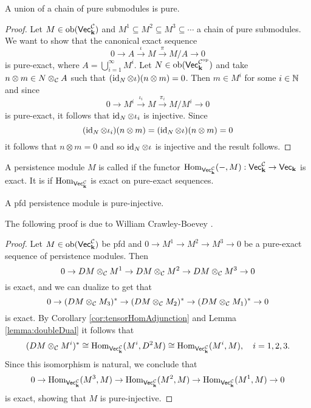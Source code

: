 \begin{lemma}\label{lemma:unionIsPure}
    A union of a chain of pure submodules is pure.
\end{lemma}
\begin{proof}
    Let $M\in\operatorname{ob}(\normalfont\mathsf{Vec}_{\mathbf{k}}^{\mathcal{C}})$ and $M^1\subseteq M^2\subseteq M^3\subseteq\cdots$ a chain of pure submodules.
    We want to show that the canonical exact sequence
    \begin{equation}\label{eq:limitOfChain}
        0\to A\xrightarrow{\iota} M\xrightarrow{\pi} M/A\to 0 
    \end{equation}
    is pure-exact, where $A=\bigcup_{i=1}^\infty M^i$.
    Let $N\in\operatorname{ob}(\normalfont\mathsf{Vec}_{\mathbf{k}}^{\mathcal{C}^{\text{op}}})$ and take $n\otimes m\in N\otimes_{\mathcal{C}} A$ such that $(\operatorname{id}_N\otimes\iota)(n\otimes m)=0$.
    Then $m\in M^i$ for some $i\in\mathbb{N}$ and since
    \[ 0\to M^i\xrightarrow{\iota_i} M\xrightarrow{\pi_i} M/M^i\to 0 \]
    is pure-exact, it follows that $\operatorname{id}_N\otimes\iota_i$ is injective. Since
    \[ (\operatorname{id}_N\otimes\iota_i)(n\otimes m)=(\operatorname{id}_N\otimes\iota)(n\otimes m)=0 \]
    it follows that $n\otimes m=0$ and so $\operatorname{id}_N\otimes\iota$ is injective and the result follows.
\end{proof}

\begin{definition}
    A persistence module $M$ is called  if the functor $\operatorname{Hom}_{\normalfont\mathsf{Vec}_{\mathbf{k}}^{\mathcal{C}}}(-, M):\normalfont\mathsf{Vec}_{\mathbf{k}}^{\mathcal{C}}\to\normalfont\mathsf{Vec}_{\mathbf{k}}$ is exact.
    It is  if $\operatorname{Hom}_{\normalfont\mathsf{Vec}_{\mathbf{k}}^{\mathcal{C}}}$ is exact on pure-exact sequences.
\end{definition}

\begin{lemma}\label{lemma:PRepsArePure}
    A pfd persistence module is pure-injective.
\end{lemma}
The following proof is due to William Crawley-Boevey \cite{crawley-boevey_2017}.
\begin{proof}
    Let $M\in\operatorname{ob}(\normalfont\mathsf{Vec}_{\mathbf{k}}^{\mathcal{C}})$ be pfd and $0\to M^1\to M^2\to M^3\to 0$ be a pure-exact sequence of persistence modules.
    Then
    \[0\to DM\otimes_{\mathcal{C}} M^1\to DM\otimes_{\mathcal{C}} M^2\to DM\otimes_{\mathcal{C}} M^3\to 0\] 
    is exact, and we can dualize to get that
    \[ 0\to (DM\otimes_{\mathcal{C}} M_3)^*\to (DM\otimes_{\mathcal{C}} M_2)^*\to (DM\otimes_{\mathcal{C}} M_1)^*\to 0 \]
    is exact.
    By Corollary \ref{cor:tensorHomAdjunction} and Lemma \ref{lemma:doubleDual} it follows that 
    \[ (DM\otimes_{\mathcal{C}} M^i)^*\cong\operatorname{Hom}_{\normalfont\mathsf{Vec}_{\mathbf{k}}^{\mathcal{C}}}(M^i, D^2M)\cong\operatorname{Hom}_{\normalfont\mathsf{Vec}_{\mathbf{k}}^{\mathcal{C}}}(M^i, M),\quad i=1,2,3.\]
    Since this isomorphism is natural, we conclude that
    \[ 0\to\operatorname{Hom}_{\normalfont\mathsf{Vec}_{\mathbf{k}}^{\mathcal{C}}}(M^3, M)\to \operatorname{Hom}_{\normalfont\mathsf{Vec}_{\mathbf{k}}^{\mathcal{C}}}(M^2,M)\to \operatorname{Hom}_{\normalfont\mathsf{Vec}_{\mathbf{k}}^{\mathcal{C}}}(M^1, M)\to 0 \]
    is exact, showing that $M$ is pure-injective. 
\end{proof}

